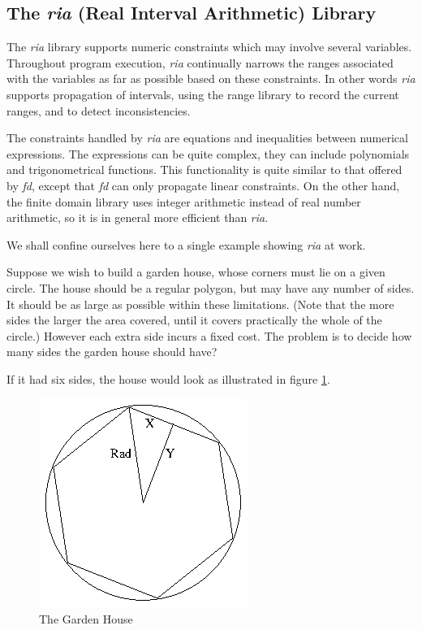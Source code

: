 \documentclass[a4wide]{article}
\begin{document}
\subsection{The {\em ria} (Real Interval Arithmetic) Library}
The {\em ria} library supports numeric constraints which may involve
several variables. 
Throughout program execution, {\em ria} continually narrows
the ranges associated with the variables as far as possible based on
these constraints.
In other words {\em ria} supports propagation of intervals, using the
range library to record the current ranges, and to detect
inconsistencies. 

The constraints handled by {\em ria} are equations and inequalities
between numerical expressions. 
The expressions can be quite complex, they can include polynomials and
trigonometrical functions.
This functionality is quite similar to that offered by {\em fd},
except that {\em fd} can only propagate linear constraints.
On the other hand, the finite domain library uses integer arithmetic
instead of real number 
arithmetic, so it is in general more efficient than {\em ria}.

We shall confine ourselves here to a single example showing {\em ria}
at work.

Suppose we wish to build a garden house, whose corners
must lie on a given circle.  The house should be a regular polygon,
but may have any number of sides.
It should be as large as possible within these limitations.
(Note that the more sides the larger the area covered, until it covers
practically the whole of the circle.)
However each extra side incurs a fixed cost.
The problem is to decide how many sides the garden house should have?

If it had six sides, the house would look as illustrated in figure
\ref{house}. 

\begin{figure}

\includegraphics{house.ps}

\caption{The Garden House}
\label{house}
\end{figure}
\end{document}
